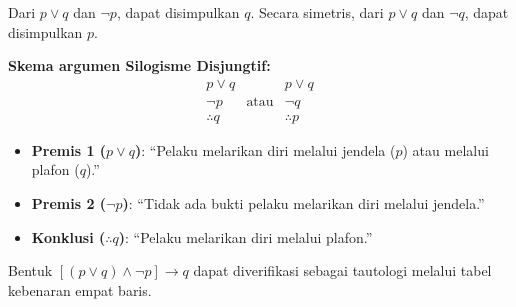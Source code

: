 \begin{teorema}
Dari $p \vee q$ dan $\neg p$, dapat disimpulkan $q$. Secara simetris, dari $p \vee q$ dan $\neg q$, dapat disimpulkan $p$.
\end{teorema}

\textbf{Skema argumen Silogisme Disjungtif:}
\[
\begin{array}{ccc}
p \vee q & & p \vee q\\
\neg p   & \text{atau} & \neg q \\
\hline
\therefore q & & \therefore p
\end{array}
\]

\begin{contoh}
\begin{itemize}
    \item \textbf{Premis 1 ($p \vee q$)}: ``Pelaku melarikan diri melalui jendela ($p$) atau melalui plafon ($q$).''
    \item \textbf{Premis 2 ($\neg p$)}: ``Tidak ada bukti pelaku melarikan diri melalui jendela.''
    \item \textbf{Konklusi ($\therefore q$)}: ``Pelaku melarikan diri melalui plafon.''
\end{itemize}
\end{contoh}

Bentuk $[(p \vee q) \land \neg p] \rightarrow q$ dapat diverifikasi sebagai tautologi melalui tabel kebenaran empat baris.
